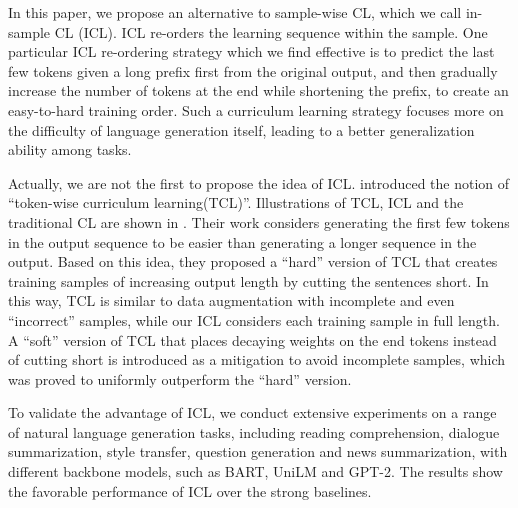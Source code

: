 In this paper, we propose an alternative to sample-wise CL, which we call 
in-sample CL (ICL). 
ICL re-orders the learning sequence within the sample. 
One particular ICL re-ordering strategy which we find effective is to predict the 
last few tokens given a long prefix first from the original output, and then gradually increase the number of tokens
at the end while shortening the prefix, to create an easy-to-hard training
order. Such a curriculum learning strategy focuses more on the difficulty of language generation itself,
leading to a better generalization ability among tasks.

Actually, we are not the first to propose the idea of ICL.
\citet{liang-etal-2021-token-wise} introduced the notion of ``token-wise curriculum learning(TCL)''. 
Illustrations of TCL, ICL and the traditional CL are shown in .
Their work considers generating the first few tokens
in the output sequence to be easier than generating a longer sequence in the output. 
Based on this idea, they proposed a ``hard'' version of TCL that creates training samples of increasing output length by cutting the sentences short. 
In this way, TCL is similar to data augmentation with incomplete and even ``incorrect'' samples, while our ICL considers each training sample in full
length. A ``soft'' version of TCL that places decaying weights on the end tokens instead of cutting short is introduced as a mitigation to avoid incomplete samples,
which was proved to uniformly outperform the ``hard'' version.


To validate the advantage of ICL, we conduct extensive experiments on a range of natural language generation tasks, including reading comprehension, dialogue summarization, style transfer, question generation and news summarization, with different backbone models, such as BART, UniLM and GPT-2. The results show the favorable performance of ICL over the strong baselines.





